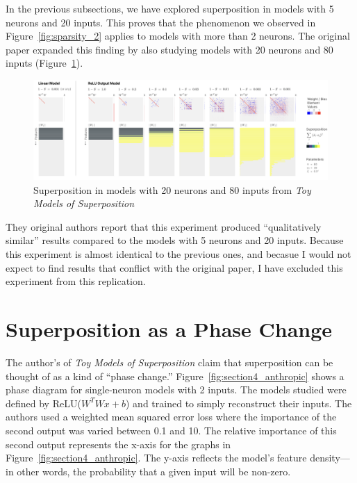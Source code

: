 \documentclass{article} %
\begin{document}
In the previous subsections, we have explored superposition in models with 5
neurons and 20 inputs. This proves that the phenomenon we observed in Figure~\ref{fig:sparsity_2}
applies to models with more than 2 neurons. The original paper expanded this 
finding by also studying models with 20 neurons and 80 inputs (Figure~\ref{fig:section3_anthropic2}). \\

\begin{figure}[h]
    \centering
    \includegraphics[width=0.99\linewidth]{demonstrating_superposition/images/anthropic_section3_part2.png}
    \captionsetup{font=footnotesize, width=0.7\linewidth} %
    \caption{
        Superposition in models with 20 neurons and 80 inputs from \textit{Toy Models of Superposition}\cite{elhage2022toy}
    }
    \label{fig:section3_anthropic2}
\end{figure}

They original authors report that this experiment produced ``qualitatively similar''
results compared to the models with 5 neurons and 20 inputs. Because this experiment 
is almost identical to the previous ones, and becasue I would not expect to find 
results that conflict with the original paper, I have excluded this experiment 
from this replication. \\

\section{Superposition as a Phase Change}

The author's of \textit{Toy Models of Superposition} claim that superposition
can be thought of as a kind of ``phase change.'' Figure~\ref{fig:section4_anthropic}
shows a phase diagram for single-neuron models with 2 inputs. The models studied were
defined by ReLU($W^TWx + b$) and trained to simply reconstruct their inputs. The authors 
used a weighted mean squared error loss where the importance of 
the second output was varied between 0.1 and 10. The relative importance of this
second output represents the x-axis for the graphs in Figure~\ref{fig:section4_anthropic}.
The y-axis reflects the model's feature density---in other words, the probability
that a given input will be non-zero.
\end{document}
